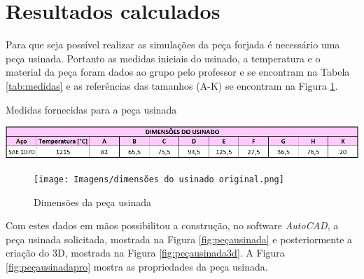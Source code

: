 \documentclass[deposito, acronym, symbols]{fei}
\begin{document}



\section{Resultados calculados}

Para que seja possível realizar as simulações da peça forjada é necessário uma peça usinada. Portanto as medidas iniciais do usinado, a temperatura e o material da peça foram dados ao grupo pelo professor e se encontram na Tabela \ref{tab:medidas} e as referências das tamanhos (A-K) se encontram na Figura \ref{fig:medidasak}.

\begin{table}[!htb]
 \centering
    \caption{Medidas fornecidas para a peça usinada}
    \includegraphics[width=1\linewidth]{Imagens/tabela de medidas usinado.png}
    \label{tab:medidas}
 \end{table}

\begin{figure}[!htp]
    \centering
    \caption{Dimensões da peça usinada}
    \texttt{[image: Imagens/dimensões do usinado original.png]}
    \label{fig:medidasak}
\end{figure}

Com estes dados em mãos possibilitou a construção, no software \textit{AutoCAD}, a peça usinada solicitada, mostrada na Figura \ref{fig:peçausinada} e posteriormente a criação do 3D, mostrada na Figura \ref{fig:peçausinada3d}. A Figura \ref{fig:peçausinadapro} mostra as propriedades da peça usinada.
\end{document}
